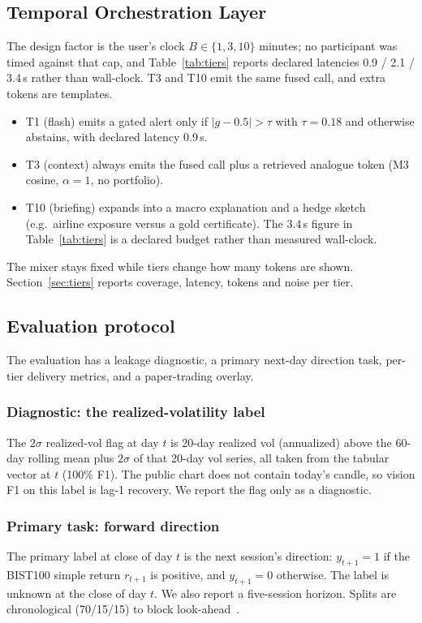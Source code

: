 \documentclass{llncs}
\begin{document}
\subsection{Temporal Orchestration Layer}
\label{sec:tol}
The design factor is the user's clock $B\in\{1,3,10\}$ minutes; no participant was timed against that cap, and Table~\ref{tab:tiers} reports declared latencies 0.9 / 2.1 / 3.4\,s rather than wall-clock. T3 and T10 emit the same fused call, and extra tokens are templates.
\begin{itemize}
\item T1 (flash) emits a gated alert only if $|g-0.5|>\tau$ with $\tau=0.18$ and otherwise abstains, with declared latency 0.9\,s.
\item T3 (context) always emits the fused call plus a retrieved analogue token (M3 cosine, $\alpha=1$, no portfolio).
\item T10 (briefing) expands into a macro explanation and a hedge sketch (e.g.\ airline exposure versus a gold certificate). The 3.4\,s figure in Table~\ref{tab:tiers} is a declared budget rather than measured wall-clock.
\end{itemize}
The mixer stays fixed while tiers change how many tokens are shown. Section~\ref{sec:tiers} reports coverage, latency, tokens and noise per tier.

\subsection{Evaluation protocol}
\label{sec:protocol}
The evaluation has a leakage diagnostic, a primary next-day direction task, per-tier delivery metrics, and a paper-trading overlay.

\subsubsection{Diagnostic: the realized-volatility label}
\label{sec:leak}
The $2\sigma$ realized-vol flag at day $t$ is 20-day realized vol (annualized) above the 60-day rolling mean plus $2\sigma$ of that 20-day vol series, all taken from the tabular vector at $t$ (100\% F1). The public chart does not contain today's candle, so vision F1 on this label is lag-1 recovery. We report the flag only as a diagnostic.

\subsubsection{Primary task: forward direction}
The primary label at close of day $t$ is the next session's direction: $y_{t+1}=1$ if the BIST100 simple return $r_{t+1}$ is positive, and $y_{t+1}=0$ otherwise. The label is unknown at the close of day $t$. We also report a five-session horizon. Splits are chronological (70/15/15) to block look-ahead~\cite{akturk2026bist}.
\end{document}
